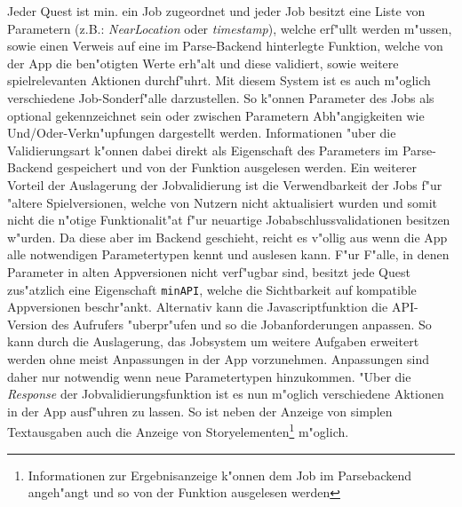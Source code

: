 \documentclass{article}
\begin{document}
Jeder Quest ist min. ein Job zugeordnet und jeder Job besitzt eine Liste von Parametern (z.B.: \textit{NearLocation} oder \textit{timestamp}), welche erf"ullt werden m"ussen, sowie einen Verweis auf eine im Parse-Backend hinterlegte Funktion, welche von der App die ben"otigten Werte erh"alt und diese validiert, sowie weitere spielrelevanten Aktionen durchf"uhrt. Mit diesem System ist es auch m"oglich verschiedene Job-Sonderf"alle darzustellen. So k"onnen Parameter des Jobs als optional gekennzeichnet sein oder zwischen Parametern Abh"angigkeiten wie Und/Oder-Verkn"upfungen dargestellt werden. Informationen "uber die Validierungsart k"onnen dabei direkt als Eigenschaft des Parameters im Parse-Backend gespeichert und von der Funktion ausgelesen werden. Ein weiterer Vorteil der Auslagerung der Jobvalidierung ist die Verwendbarkeit der Jobs f"ur "altere Spielversionen, welche von Nutzern nicht aktualisiert wurden und somit nicht die n"otige Funktionalit"at f"ur neuartige Jobabschlussvalidationen besitzen w"urden. Da diese aber im Backend geschieht, reicht es v"ollig aus wenn die App alle notwendigen Parametertypen kennt und auslesen kann. F"ur F"alle, in denen Parameter in alten Appversionen nicht verf"ugbar sind, besitzt jede Quest zus"atzlich eine Eigenschaft \texttt{minAPI}, welche die Sichtbarkeit auf kompatible Appversionen beschr"ankt. Alternativ kann die Javascriptfunktion die API-Version des Aufrufers "uberpr"ufen und so die Jobanforderungen anpassen. So kann durch die Auslagerung, das Jobsystem um weitere Aufgaben erweitert werden ohne meist Anpassungen in der App vorzunehmen. Anpassungen sind daher nur notwendig wenn neue Parametertypen hinzukommen. "Uber die \textit{Response} der Jobvalidierungsfunktion ist es nun m"oglich verschiedene Aktionen in der App ausf"uhren zu lassen. So ist neben der Anzeige von simplen Textausgaben auch die Anzeige von Storyelementen\footnote{Informationen zur Ergebnisanzeige k"onnen dem Job im Parsebackend angeh"angt und so von der Funktion ausgelesen werden} m"oglich.
\end{document}
